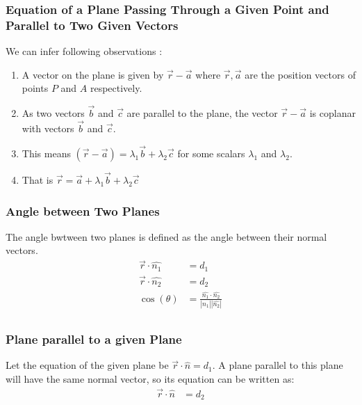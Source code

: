 \begin{frame}
\frametitle{Equation of a Plane Passing Through
a Given Point and Parallel to Two
Given Vectors}
We can infer following observations :
\begin{enumerate}
    \item A vector on the plane is given by \( \vec{r} - \vec{a} \) where \(\vec{r},\vec{a}\) are the position vectors of points \(P\) and \(A\) respectively.
    \item As two vectors \( \vec{b} \) and \( \vec{c} \) are parallel to the plane, the vector \( \vec{r} - \vec{a} \) is coplanar with vectors \( \vec{b} \) and \( \vec{c} \). 
    \item This means \((\vec{r} - \vec{a}) = \lambda_1 \vec{b} + \lambda_2 \vec{c}\) for some scalars \(\lambda_1\) and \(\lambda_2\).
    \item That is \(\vec{r} = \vec{a} + \lambda_1 \vec{b} + \lambda_2 \vec{c}\)
\end{enumerate}     
\end{frame}

\begin{frame}
    \frametitle{Angle between Two Planes}
    The angle bwtween two planes is defined as the angle between their normal vectors. 
    \begin{align*}
        \vec{r} \cdot \hat{n_1} &= d_1 \\
        \vec{r} \cdot \hat{n_2} &= d_2 \\
        \cos(\theta) &= \frac{\hat{n_1} \cdot \hat{n_2}}{|\hat{n_1}| |\hat{n_2}|} \\
    \end{align*}
\end{frame}

\begin{frame}
    \frametitle{Plane parallel to a given Plane}
    Let the equation of the given plane be \( \vec{r} \cdot \hat{n} = d_{1}\). 
    A plane parallel to this plane will have the same normal vector, so its equation can be written as:
    \begin{align*}
    \vec{r} \cdot \hat{n} &= d_{2} \\
    \end{align*}
    
\end{frame}

